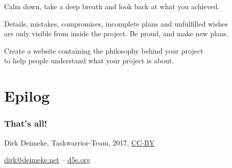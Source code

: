 \documentclass[t,aspectratio=169]{beamer}
\begin{document}
\begin{frame}[fragile]%
    \vfill
    Calm down, take a deep breath and look back at what you achieved. \pause

    Details, mistakes, compromises, incomplete plans and unfulfilled wishes \\
    are only visible from inside the project. Be proud, and make new plans.
\end{frame}

\begin{frame}[fragile]%
    \vfill
    Create a website containing the philosophy behind your project \\
    to help people understand what your project is about.
\end{frame}

\section{Epilog}

\begin{frame}[fragile]\frametitle{That's all!}
    \vfill
    \begin{center}
        Dirk Deimeke, Taskwarrior-Team, 2017, \href{https://creativecommons.org/licenses/by/4.0/}{CC-BY}

        \href{mailto:dirk@deimeke.net}{dirk@deimeke.net} -- \href{https://d5e.org/}{d5e.org}
    \end{center}
\end{frame}
\end{document}
